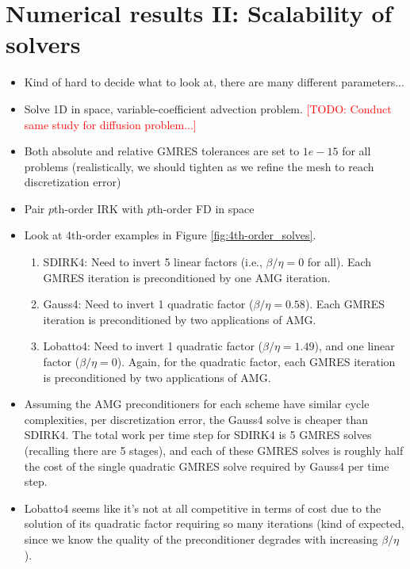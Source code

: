 \documentclass[review]{siamart}
\makeatletter
\newcommand{\todo}[1]{\textcolor{red}{[TODO\@: #1]}}
\makeatother
\begin{document}
\newpage
\newpage
\section{Numerical results II: Scalability of solvers}

\begin{itemize}
\setlength\itemsep{0.5em}

\item Kind of hard to decide what  to look at, there are many different parameters...

\item Solve 1D in space, variable-coefficient advection problem. \todo{Conduct same study for diffusion problem...}

\item Both absolute and relative GMRES tolerances are set to $1e-15$ for all problems (realistically, we should tighten as we refine the mesh to reach discretization error)

\item Pair $p$th-order IRK with  $p$th-order FD in space

\item Look at 4th-order examples in Figure \ref{fig:4th-order_solves}.
\begin{enumerate}
\item SDIRK4: Need to invert 5 linear factors (i.e., $\beta/\eta=0$ for all). Each GMRES iteration is preconditioned by one AMG iteration. 

\item Gauss4: Need to invert 1 quadratic factor ($\beta/\eta=0.58$). Each GMRES iteration is preconditioned by two applications of AMG. 

\item Lobatto4: Need to invert 1 quadratic factor ($\beta/\eta=1.49$), and one linear factor ($\beta/\eta=0$). Again, for the quadratic factor, each GMRES iteration is preconditioned by two applications of AMG. 

\end{enumerate}

\item Assuming the AMG preconditioners for each scheme have similar cycle complexities, per discretization error, the Gauss4 solve is cheaper than SDIRK4. The total work per time step for SDIRK4 is 5 GMRES solves (recalling there are 5 stages), and each of these GMRES solves is roughly half the cost of the single quadratic GMRES solve required by Gauss4 per time step.

\item Lobatto4 seems like it's not at all competitive in terms of cost due to the solution of its quadratic factor requiring so many iterations (kind of expected, since we know the quality of the preconditioner degrades with increasing $\beta/\eta$).

\end{itemize}
\end{document}
